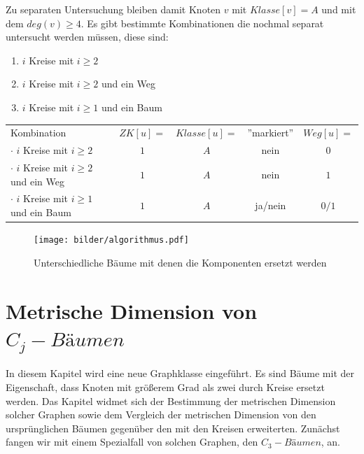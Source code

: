 Zu separaten Untersuchung bleiben damit Knoten $v$ mit $Klasse[v]=A$ und mit dem $deg(v)\geq 4$. Es gibt bestimmte Kombinationen die nochmal separat untersucht werden müssen, diese sind:
\begin{enumerate}
\item $i$ Kreise mit $i\geq 2$
\item $i$ Kreise mit $i\geq 2$ und ein Weg
\item $i$ Kreise mit $i\geq 1$ und ein Baum
\end{enumerate}
\begin{tabular}{lcccc}
Kombination & $ZK[u]=$ & $Klasse[u]=$ & ''markiert''& $Weg[u]=$ \\
$\cdot$ $i$ Kreise mit $i\geq 2$& $1$& $A$ & nein& $0$\\
$\cdot$ $i$ Kreise mit $i\geq 2$ und ein Weg &$1$& $A$& nein &$1$\\
$\cdot$ $i$ Kreise mit $i\geq 1$ und ein Baum & $1$& $A$& ja/nein &$0/1$\\
\end{tabular}
\begin{figure}[h!]
		\centering 		 
   \texttt{[image: bilder/algorithmus.pdf]}
	\caption{Unterschiedliche Bäume mit denen die Komponenten ersetzt werden}
  	 \end{figure}
\newpage
\chapter{Metrische Dimension von $C_j-Bäumen$}
\label{kapcjbaume}
In diesem Kapitel wird eine neue Graphklasse eingeführt. Es sind Bäume mit der Eigenschaft, dass Knoten mit größerem Grad als zwei durch Kreise ersetzt werden. Das Kapitel widmet sich der Bestimmung der metrischen Dimension solcher Graphen sowie dem Vergleich der metrischen Dimension von den ursprünglichen Bäumen gegenüber den mit den Kreisen erweiterten. Zunächst fangen wir mit einem Spezialfall von solchen Graphen, den $C_3-Bäumen$, an.
